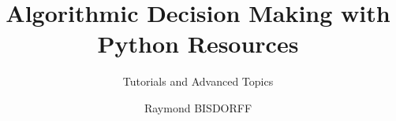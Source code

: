 \documentclass[12pt,envcountchap,sectrefs,english]{svmono}
\begin{document}
\author{Raymond BISDORFF}
\title{Algorithmic Decision Making with Python Resources}
\subtitle{Tutorials and Advanced Topics}
\maketitle

\frontmatter%


%

%

\tableofcontents

%


\mainmatter%
\lstset{style=pythonstyle}


       


\lstset{style=pythonstyle}

























\end{document}
